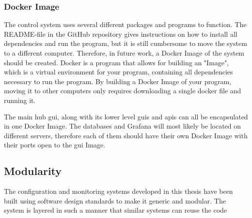 \documentclass[main.tex]{subfiles}
\begin{document}
 \subsubsection{Docker Image}
 
 The control system uses several different packages and programs to function. The README-file in the GitHub repository gives instructions on how to install all dependencies and run the program, but it is still cumbersome to move the system to a different computer. Therefore, in future work, a Docker Image of the system should be created. Docker is a program that allows for building an "Image", which is a virtual environment for your program, containing all dependencies necessary to run the program. By building a Docker Image of your program, moving it to other computers only requires downloading a single docker file and running it.
 
 The main hub \gls{gui}, along with its lower level \gls{gui}s and \gls{api}s can all be encapsulated in one Docker Image. The databases and Grafana will most likely be located on different servers, therefore each of them should have their own Docker Image with their ports open to the \gls{gui} Image.
 
 \subsection{Modularity}
 
 The configuration and monitoring systems developed in this thesis have been built using software design standards to make it generic and modular. The system is layered in such a manner that similar systems can reuse the code
 
 
\end{document}
